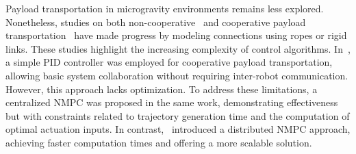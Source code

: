 Payload transportation in microgravity environments remains less explored. Nonetheless, studies on both non-cooperative~\cite{9429795} and cooperative payload transportation~\cite{9438133,9429795,phodapol2024collaborative} have made progress by modeling connections using ropes or rigid links. These studies highlight the increasing complexity of control algorithms. In~\cite{9438133}, a simple PID controller was employed for cooperative payload transportation, allowing basic system collaboration without requiring inter-robot communication. However, this approach lacks optimization. To address these limitations, a centralized NMPC was proposed in the same work, demonstrating effectiveness but with constraints related to trajectory generation time and the computation of optimal actuation inputs. In contrast,~\cite{phodapol2024collaborative} introduced a distributed NMPC approach, achieving faster computation times and offering a more scalable solution.
